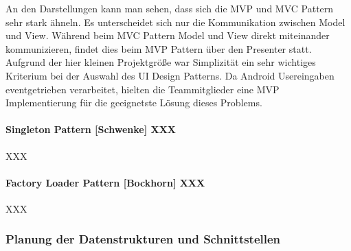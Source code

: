 
An den Darstellungen kann man sehen, dass sich die MVP und MVC Pattern sehr stark ähneln. Es unterscheidet sich nur die Kommunikation zwischen Model und View. Während beim MVC Pattern Model und View direkt miteinander kommunizieren, findet dies beim MVP Pattern über den Presenter statt. Aufgrund der hier kleinen Projektgröße war Simplizität ein sehr wichtiges Kriterium bei der Auswahl des UI Design Patterns. Da Android Usereingaben eventgetrieben verarbeitet, hielten die Teammitglieder eine MVP Implementierung für die geeignetste Lösung dieses Problems.

\clearpage

\paragraph{Singleton Pattern [Schwenke] XXX}

XXX

\clearpage

\paragraph{Factory Loader Pattern [Bockhorn] XXX}

XXX

\clearpage

\subsubsection{Planung der Datenstrukturen und Schnittstellen}


\enlargethispage{3\baselineskip}

